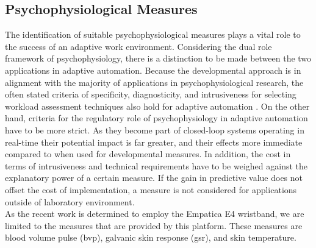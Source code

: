 \subsection{Psychophysiological Measures} \label{physmeas}
The identification of suitable psychophysiological measures plays a vital role to the success of an adaptive work environment. Considering the dual role framework of psychophysiology, there is a distinction to be made between the two applications in adaptive automation. Because the developmental approach is in alignment with the majority of applications in psychophysiological research, the often stated criteria of specificity, diagnosticity, and intrusiveness for selecting workload assessment techniques also hold for adaptive automation \cite{Byrne1996}. On the other hand, criteria for the regulatory role of psychophysiology in adaptive automation have to be more strict. As they become part of closed-loop systems operating in real-time their potential impact is far greater, and their effects more immediate compared to when used for developmental measures.  
In addition, the cost in terms of intrusiveness and technical requirements have to be weighed against the explanatory power of a certain measure. If the gain in predictive value does not offset the cost of implementation, a measure is not considered for applications outside of laboratory environment.\\
As the recent work is determined to employ the Empatica E4 wristband, we are limited to the measures that are provided by this platform. These measures are blood volume pulse (\gls{bvp}), galvanic skin response (\gls{gsr}), and skin temperature.
